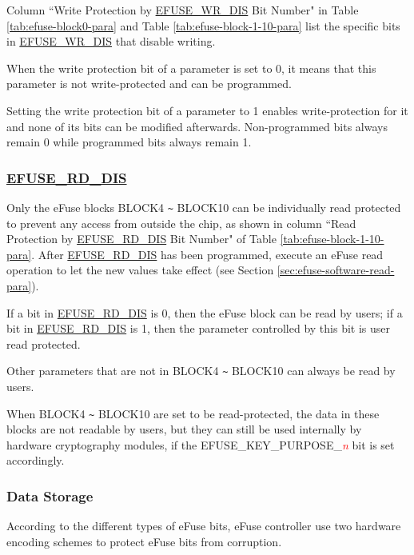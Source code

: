 \documentclass[main\_\_EN.tex]{subfiles}
\begin{document}
Column ``Write Protection by \hyperref[fielddesc:EFUSEWRDIS]{EFUSE\_WR\_DIS} Bit Number" in Table  \ref{tab:efuse-block0-para} and Table \ref{tab:efuse-block-1-10-para} list the specific bits in \hyperref[fielddesc:EFUSEWRDIS]{EFUSE\_WR\_DIS} that disable writing.

When the write protection bit of a parameter is set to 0, it means that this parameter is not write-protected and can be programmed.

Setting the write protection bit of a parameter to 1 enables write-protection for it and none of its bits can be modified afterwards. Non-programmed bits always remain 0 while programmed bits always remain 1.

\subsubsection{\hyperref[fielddesc:EFUSERDDIS]{EFUSE\_RD\_DIS}}
\label{sec:efuse-rd-dis}

Only the eFuse blocks BLOCK4 \verb+~+ BLOCK10 can be individually read protected to prevent any access from outside the chip, as shown in column ``Read Protection by \hyperref[fielddesc:EFUSERDDIS]{EFUSE\_RD\_DIS} Bit Number" of Table  \ref{tab:efuse-block-1-10-para}. After \hyperref[fielddesc:EFUSERDDIS]{EFUSE\_RD\_DIS} has been programmed, execute an eFuse read operation to let the new values take effect (see Section \ref{sec:efuse-software-read-para}).

If a bit in \hyperref[fielddesc:EFUSERDDIS]{EFUSE\_RD\_DIS} is 0, then the eFuse block can be read by users; if a bit in \hyperref[fielddesc:EFUSERDDIS]{EFUSE\_RD\_DIS} is 1, then the parameter controlled by this bit is user read protected.

Other parameters that are not in BLOCK4 \verb+~+ BLOCK10 can always be read by users.

When BLOCK4 \verb+~+ BLOCK10 are set to be read-protected, the data in these blocks are not readable by users, but they can still be used internally by hardware cryptography modules, if the EFUSE\_KEY\_PURPOSE\_\textcolor{red}{\it{n}} bit is set accordingly.

\subsubsection{Data Storage}
\label{sec:efuse-data-storage}

According to the different types of eFuse bits, eFuse controller use two hardware encoding schemes to protect eFuse bits from corruption.
\end{document}

